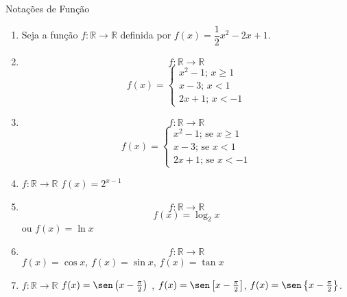 \documentclass[a4paper, 12pt]{article}
\begin{document}
Notações de Função
    \begin{enumerate}
        \item Seja a função $f : \mathbb{R} \to \mathbb{R}$ definida por
        $f(x) = \dfrac{1}{2}x^2 - 2x + 1$.
        \item $$f : \mathbb{R} \to \mathbb{R}$$
        $$f(x) = 
            \begin{cases}
                x^2 - 1; \, x \geq 1 \\
                x - 3 ; \, x < 1 \\
                2x + 1; \, x < -1
            \end{cases}
        $$
        \item $$f : \mathbb{R} \to \mathbb{R}$$
        $$f(x) = 
            \begin{cases}
                x^2 - 1; \,\textrm{se } x \geq 1 \\
                x - 3 ; \,\textrm{se } x < 1 \\
                2x + 1; \,\textrm{se } x < -1
            \end{cases}
        $$
        \item $f : \mathbb{R} \to \mathbb{R}$
        $f(x) = 2^{x-1}$
        \item $$f : \mathbb{R} \to \mathbb{R}$$
        $$f(x) = \log_2 x $$ ou $f(x) = \ln x$
        \item $$f : \mathbb{R} \to \mathbb{R}$$
        $f(x) = \cos x $, $f(x) = \sin x$, $f(x) = \tan x$
        \item $f : \mathbb{R} \to \mathbb{R}$
        $f(x) = \sen \left(x - \frac{\pi}{2}\right)$ ,
        $f(x) = \sen \left[x - \frac{\pi}{2}\right]$,
        $f(x) = \sen \left\{x - \frac{\pi}{2}\right\}$.
    \end{enumerate}
\end{document}
